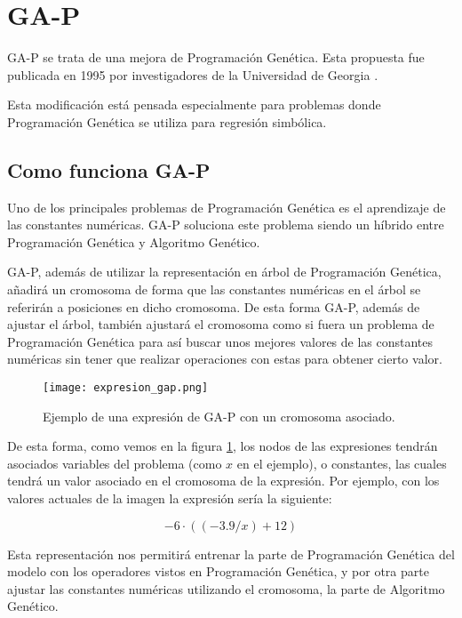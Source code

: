 \section{GA-P}

GA-P se trata de una mejora de Programación Genética. Esta propuesta fue publicada en 1995 por investigadores de la Universidad de Georgia \cite{primerGAP}.

Esta modificación está pensada especialmente para problemas donde Programación Genética se utiliza para regresión simbólica.

\subsection{Como funciona GA-P}

Uno de los principales problemas de Programación Genética es el aprendizaje de las constantes numéricas. GA-P soluciona este problema siendo un híbrido entre Programación Genética y Algoritmo Genético.

GA-P, además de utilizar la representación en árbol de Programación Genética, añadirá un cromosoma de forma que las constantes numéricas en el árbol se referirán a posiciones en dicho cromosoma. De esta forma GA-P, además de ajustar el árbol, también ajustará el cromosoma como si fuera un problema de Programación Genética para así buscar unos mejores valores de las constantes numéricas sin tener que realizar operaciones con estas para obtener cierto valor.

\begin{figure}[H]
    \centering
	  \texttt{[image: expresion\_gap.png]}
    \caption{Ejemplo de una expresión de GA-P con un cromosoma asociado.}
	 \label{fig:expresion_gap}
\end{figure}

De esta forma, como vemos en la figura \ref{fig:expresion_gap}, los nodos de las expresiones tendrán asociados variables del problema (como $x$ en el ejemplo), o constantes, las cuales tendrá un valor asociado en el cromosoma de la expresión. Por ejemplo, con los valores actuales de la imagen la expresión sería la siguiente:

$$ -6 \cdot ( (-3.9 / x) + 12 ) $$

Esta representación nos permitirá entrenar la parte de Programación Genética del modelo con los operadores vistos en Programación Genética, y por otra parte ajustar las constantes numéricas utilizando el cromosoma, la parte de Algoritmo Genético.

